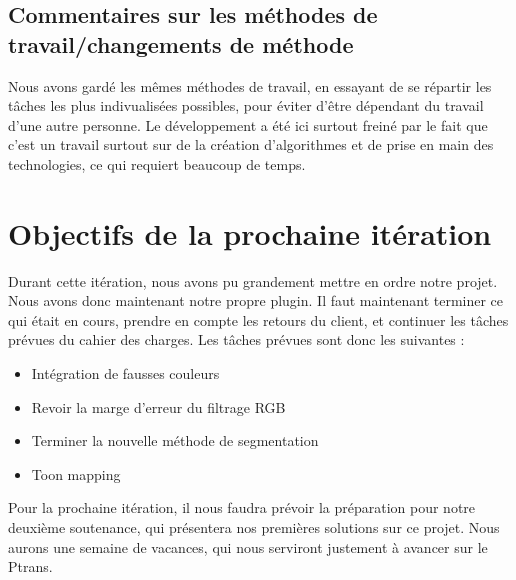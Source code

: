 \documentclass[12pt,titlepage,french]{article}
\begin{document}
\subsection{Commentaires sur les méthodes de travail/changements de méthode}

Nous avons gardé les mêmes méthodes de travail, en essayant de se répartir les tâches les plus indivualisées possibles, pour éviter d'être dépendant du travail d'une autre personne. Le développement a été ici surtout freiné par le fait que c'est un travail surtout sur de la création d'algorithmes et de prise en main des technologies, ce qui requiert beaucoup de temps.

\section{Objectifs de la prochaine itération}

Durant cette itération, nous avons pu grandement mettre en ordre notre projet. Nous avons donc maintenant notre propre plugin. Il faut maintenant terminer ce qui était en cours, prendre en compte les retours du client, et continuer les tâches prévues du cahier des charges. Les tâches prévues sont donc les suivantes :

\begin{itemize}
  \item Intégration de fausses couleurs
  \item Revoir la marge d'erreur du filtrage RGB
  \item Terminer la nouvelle méthode de segmentation
  \item Toon mapping \newline
\end{itemize}

Pour la prochaine itération, il nous faudra prévoir la préparation pour notre deuxième soutenance, qui présentera nos premières solutions sur ce projet. Nous aurons une semaine de vacances, qui nous serviront justement à avancer sur le Ptrans.
\end{document}
